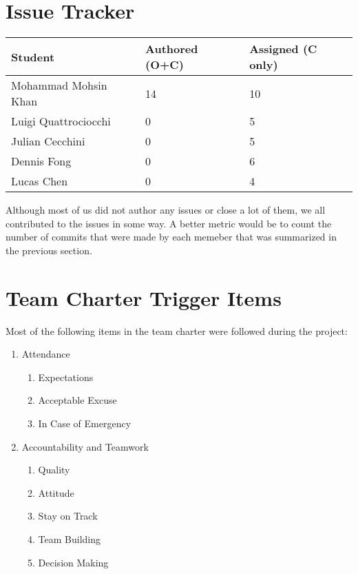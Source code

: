 \documentclass{article}
\begin{document}

\section{Issue Tracker}


\begin{table}[H]
\centering
\begin{tabular}{lll}
\toprule
\textbf{Student} & \textbf{Authored (O+C)} & \textbf{Assigned (C only)}\\
\midrule
Mohammad Mohsin Khan & 14 & 10 \\
Luigi Quattrociocchi & 0 & 5 \\
Julian Cecchini & 0 & 5 \\
Dennis Fong & 0 & 6 \\
Lucas Chen & 0 & 4 \\
\bottomrule
\end{tabular}
\end{table}

Although most of us did not author any issues or close a lot of them, we all contributed
to the issues in some way. A better metric would be to count the number of
commits that were made by each memeber that was summarized in the previous
section.

\section{Team Charter Trigger Items}

Most of the following items in the team charter were followed during the project:
\begin{enumerate}
    \item Attendance
    \begin{enumerate}
        \item Expectations
        \item Acceptable Excuse
        \item In Case of Emergency
    \end{enumerate}
    \item Accountability and Teamwork
    \begin{enumerate}
        \item Quality
        \item Attitude
        \item Stay on Track
        \item Team Building
        \item Decision Making
    \end{enumerate}
\end{enumerate}
\end{document}
